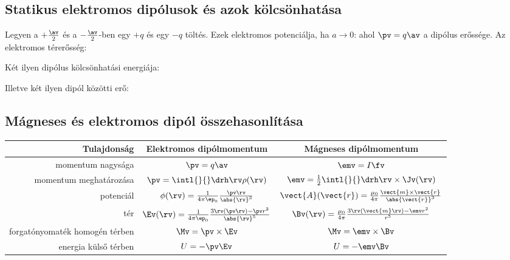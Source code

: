   \subsection{Statikus elektromos dipólusok és azok kölcsönhatása}\label{ss:A06-dipol}
   
   Legyen a $+\frac{\av}{2}$ és a $-\frac{\av}{2}$-ben egy $+q$ és egy $-q$ töltés.
   Ezek elektromos potenciálja, ha $a\to0$:
   ahol $\pv=q\av$ a dipólus erőssége.
   Az elektromos térerősség:
   
   Két ilyen dipólus kölcsönhatási energiája: 
   
   Illetve két ilyen dipól közötti erő:
   
  \subsection{Mágneses és elektromos dipól összehasonlítása}
   
   \begin{center}
    \begin{tabular}{r||c|c}
     Tulajdonság & Elektromos dipólmomentum & Mágneses dipólmomentum \\ \hline
      momentum nagysága & $\pv=q\av$ & $\emv=I\fv$ \\
      momentum meghatározása & $\pv=\intl{}{}\drh\rv\rho(\rv)$ & $\emv=\frac{1}{2}\intl{}{}\drh\rv\times\Jv(\rv)$ \\
      potenciál & $\phi(\rv)=\frac{1}{4\pi\ep_0}\frac{\pv\rv}{\abs{\rv}^3}$ & $\vect{A}(\vect{r})=\frac{\mu_0}{4\pi}\frac{\vect{m}\times\vect{r}}{\abs{\vect{r}}^{3}}$ \\
      tér & $\Ev(\rv)=\frac{1}{4\pi\ep_0}\frac{3\rv(\pv\rv)-\pv r^2}{\abs{\rv}^5}$ & $\Bv(\rv)=\frac{\mu_0}{4\pi}\frac{3\rv(\vect{m}\rv)-\emv r^2}{r^5}$ \\
      forgatónyomaték homogén térben & $\Mv=\pv\times\Ev$ & $\Mv=\emv\times\Bv$ \\
      energia külső térben & $U=-\pv\Ev$ & $U=-\emv\Bv$
    \end{tabular}
   \end{center}
   
